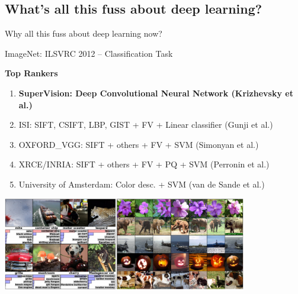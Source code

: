 \documentclass{beamer}
\begin{document}
\subsection{What's all this fuss about deep learning?}

\begin{frame}
    \centering 
    Why all this fuss about deep learning now?
\end{frame}

\begin{frame}{ImageNet: ILSVRC 2012 -- Classification Task}

    {\bf Top Rankers}
    {\small
    \begin{enumerate}
        \item {\bf SuperVision: Deep Convolutional Neural Network
            {\scriptsize (Krizhevsky et al.)}}
        \item ISI: SIFT, CSIFT, LBP, GIST + FV + Linear
            classifier {\scriptsize (Gunji et al.)}
        \item OXFORD\_VGG: SIFT + others + FV + SVM
            {\scriptsize (Simonyan et al.)}
        \item XRCE/INRIA: SIFT + others + FV + PQ + SVM
            {\scriptsize (Perronin et al.)}
        \item University of Amsterdam: Color desc. + SVM
            {\scriptsize (van de Sande et al.)}
    \end{enumerate}
    }

    \centering
    \includegraphics[width=0.8\textwidth]{krizhevsky.png}
    \\

\end{frame}
\end{document}
